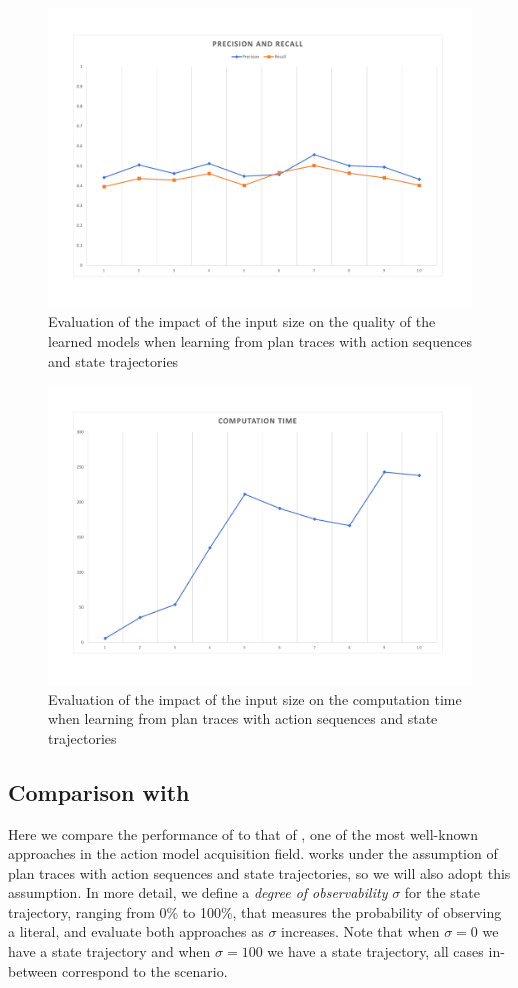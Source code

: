 \begin{figure}[hbt!]
	\centering
	\includegraphics[width=0.8\linewidth]{figures/input_size_0_0_precision.pdf}
	\caption{Evaluation of the impact of the input size on the quality of the learned models when learning from plan traces with \NO action sequences and \NO state trajectories}
\end{figure}

\begin{figure}[hbt!]
	\centering
	\includegraphics[width=0.8\linewidth]{figures/input_size_0_0_time.pdf}
	\caption{Evaluation of the impact of the input size on the computation time when learning from plan traces with \NO action sequences and \NO state trajectories}
\end{figure}

\subsection{Comparison with \ARMS}
Here we compare the performance of \FAMA to that of \ARMS, one of the most well-known approaches in the action model acquisition field. \ARMS works under the assumption of plan traces with \FO action sequences and \NO state trajectories, so we will also adopt this assumption. In more detail, we define a \emph{degree of observability} $\sigma$ for the state trajectory, ranging from 0\% to 100\%, that measures the probability of observing a literal, and evaluate both approaches as $\sigma$ increases. Note that when $\sigma = 0$ we have a \NO state trajectory and when $\sigma=100$ we have a \FO state trajectory, all cases in-between correspond to the \PO scenario.

